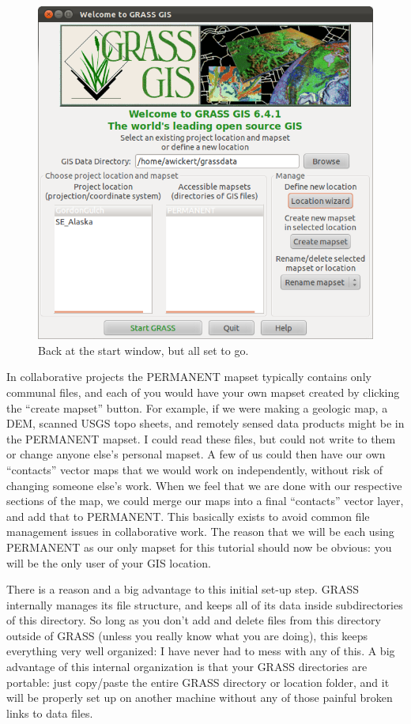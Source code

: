 \documentclass{book}
\begin{document}
\begin{figure}[h]
 \begin{center}
 \includegraphics[width=.9\linewidth]{figures/ubuntu/startup_screen_ready.png}
 \caption{Back at the start window, but all set to go.}
 \label{fig:startup_screen_ready}
 \end{center}
\end{figure}

In collaborative projects the PERMANENT mapset typically contains only communal files, and each of you would have your own mapset created by clicking the ``create mapset'' button. For example, if we were making a geologic map, a DEM, scanned USGS topo sheets, and remotely sensed data products might be in the PERMANENT mapset. I could read these files, but could not write to them or change anyone else's personal mapset. A few of us could then have our own ``contacts'' vector maps that we would work on independently, without risk of changing someone else's work. When we feel that we are done with our respective sections of the map, we could merge our maps into a final ``contacts'' vector layer, and add that to PERMANENT. This basically exists to avoid common file management issues in collaborative work. The reason that we will be each using PERMANENT as our only mapset for this tutorial should now be obvious: you will be the only user of your GIS location.

There is a reason and a big advantage to this initial set-up step. GRASS internally manages its file structure, and keeps all of its data inside subdirectories of this directory. So long as you don't add and delete files from this directory outside of GRASS (unless you really know what you are doing), this keeps everything very well organized: I have never had to mess with any of this. A big advantage of this internal organization is that your GRASS directories are portable: just copy/paste the entire GRASS directory or location folder, and it will be properly set up on another machine without any of those painful broken links to data files.
\end{document}
